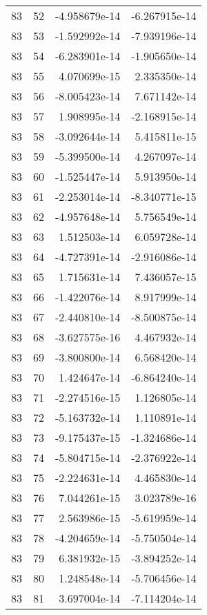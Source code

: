 \begin{tabular}{rrrr}
  83 &   52 & -4.958679e-14 & -6.267915e-14 \\
  83 &   53 & -1.592992e-14 & -7.939196e-14 \\
  83 &   54 & -6.283901e-14 & -1.905650e-14 \\
  83 &   55 &  4.070699e-15 &  2.335350e-14 \\
  83 &   56 & -8.005423e-14 &  7.671142e-14 \\
  83 &   57 &  1.908995e-14 & -2.168915e-14 \\
  83 &   58 & -3.092644e-14 &  5.415811e-15 \\
  83 &   59 & -5.399500e-14 &  4.267097e-14 \\
  83 &   60 & -1.525447e-14 &  5.913950e-14 \\
  83 &   61 & -2.253014e-14 & -8.340771e-15 \\
  83 &   62 & -4.957648e-14 &  5.756549e-14 \\
  83 &   63 &  1.512503e-14 &  6.059728e-14 \\
  83 &   64 & -4.727391e-14 & -2.916086e-14 \\
  83 &   65 &  1.715631e-14 &  7.436057e-15 \\
  83 &   66 & -1.422076e-14 &  8.917999e-14 \\
  83 &   67 & -2.440810e-14 & -8.500875e-14 \\
  83 &   68 & -3.627575e-16 &  4.467932e-14 \\
  83 &   69 & -3.800800e-14 &  6.568420e-14 \\
  83 &   70 &  1.424647e-14 & -6.864240e-14 \\
  83 &   71 & -2.274516e-15 &  1.126805e-14 \\
  83 &   72 & -5.163732e-14 &  1.110891e-14 \\
  83 &   73 & -9.175437e-15 & -1.324686e-14 \\
  83 &   74 & -5.804715e-14 & -2.376922e-14 \\
  83 &   75 & -2.224631e-14 &  4.465830e-14 \\
  83 &   76 &  7.044261e-15 &  3.023789e-16 \\
  83 &   77 &  2.563986e-15 & -5.619959e-14 \\
  83 &   78 & -4.204659e-14 & -5.750504e-14 \\
  83 &   79 &  6.381932e-15 & -3.894252e-14 \\
  83 &   80 &  1.248548e-14 & -5.706456e-14 \\
  83 &   81 &  3.697004e-14 & -7.114204e-14 \\

\end{tabular}
